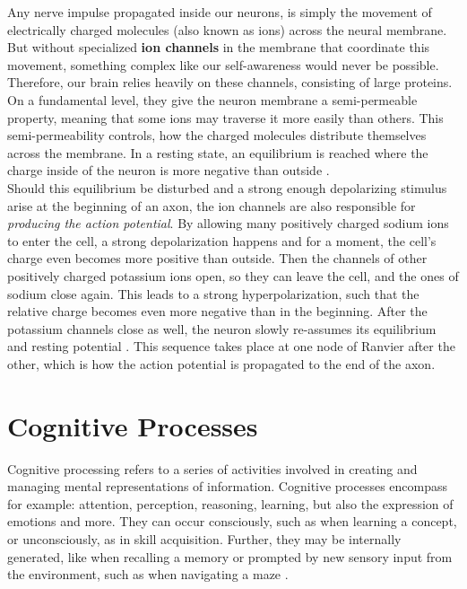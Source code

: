     Any nerve impulse propagated inside our neurons, is simply the movement of electrically charged molecules (also known as ions) across the neural membrane. But without specialized \textbf{ion channels} in the membrane that coordinate this movement, something complex like our self-awareness would never be possible. Therefore, our brain relies heavily on these channels, consisting of large proteins. On a fundamental level, they give the neuron membrane a semi-permeable property, meaning that some ions may traverse it more easily than others. This semi-permeability controls, how the charged molecules distribute themselves across the membrane. In a resting state, an equilibrium is reached where the charge inside of the neuron is more negative than outside \cite{thebrain-SimpleToComplex-mollecularFunction-i}. %
    \\
    Should this equilibrium be disturbed and a strong enough depolarizing stimulus arise at the beginning of an axon, the ion channels are also responsible for \textit{producing the action potential}. By allowing many positively charged sodium ions to enter the cell, a strong depolarization happens and for a moment, the cell's charge even becomes more positive than outside. Then the channels of other positively charged potassium ions open, so they can leave the cell, and the ones of sodium close again. This leads to a strong hyperpolarization, such that the relative charge becomes even more negative than in the beginning. After the potassium channels close as well, the neuron slowly re-assumes its equilibrium and resting potential \cite{Banich.2018}.
    This sequence takes place at one node of Ranvier after the other, which is how the action potential is propagated to the end of the axon.
    


\section{Cognitive Processes}
    
    Cognitive processing refers to a series of activities involved in creating and managing mental representations of information. Cognitive processes encompass for example: attention, perception, reasoning, learning, but also the expression of emotions and more.
    They can occur consciously, such as when learning a concept, or unconsciously, as in skill acquisition. Further, they may be internally generated, like when recalling a memory or prompted by new sensory input from the environment, such as when navigating a maze \cite{Krch.2011}.
    
